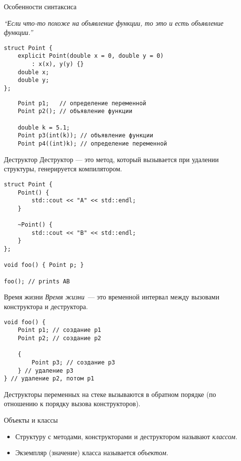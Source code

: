 \documentclass{beamer}
\begin{document}
\begin{frame}[fragile]{Особенности синтаксиса \langcpp}

    {\em ``Если что-то похоже на объявление функции, то это
    и есть объявление функции.''}
\begin{lstlisting}
struct Point {
    explicit Point(double x = 0, double y = 0) 
        : x(x), y(y) {}
    double x;
    double y;
};
\end{lstlisting}
\begin{lstlisting}
    Point p1;   // определение переменной
    Point p2(); // объявление функции

    double k = 5.1;
    Point p3(int(k)); // объявление функции
    Point p4((int)k); // определение переменной
\end{lstlisting}
\end{frame}

\begin{frame}[fragile]{Деструктор}
    Деструктор — это метод, который вызывается при удалении структуры,
    генерируется компилятором.
\begin{lstlisting}
struct Point {
    Point() {
        std::cout << "A" << std::endl;
    }

    ~Point() {
        std::cout << "B" << std::endl;
    }
};

void foo() { Point p; }

foo(); // prints AB
\end{lstlisting}
\end{frame}

\begin{frame}[fragile]{Время жизни}{}
    {\em Время жизни}~--- это временной интервал 
    между вызовами конструктора и деструктора.
\begin{lstlisting}
void foo() {
    Point p1; // создание p1
    Point p2; // создание p2

    {
        Point p3; // создание p3
    } // удаление p3
} // удаление p2, потом p1
\end{lstlisting}
Деструкторы переменных на стеке вызываются в обратном
порядке (по отношению к порядку вызова конструкторов).
\end{frame}

\begin{frame}[fragile]{Объекты и классы}
    \small
    \begin{itemize}
        \item Структуру с методами, конструкторами и деструктором
            называют {\em классом}.
        \item Экземпляр (значение) класса называется {\em объектом}.
    \end{itemize}
\end{frame}
\end{document}
